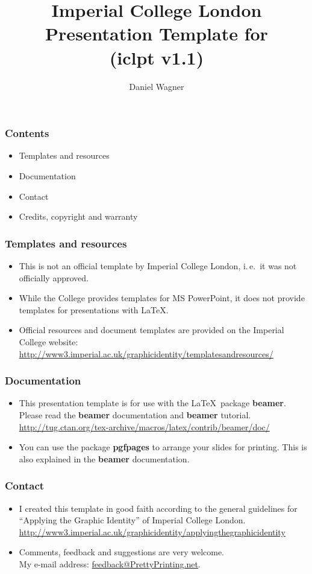 \documentclass[t]{beamer}
\author{Daniel Wagner}
\title[Imperial College London Presentation Template]{Imperial
College London\\Presentation Template for \LaTeXe\\
(iclpt v1.1)}
\begin{document}
\frame{\maketitle}

\begin{frame}
\frametitle{Contents}
	\begin{itemize}
	\item Templates and resources
	\item Documentation
	\item Contact
	\item Credits, copyright and warranty
	\end{itemize}
\end{frame}

\begin{frame}
\frametitle{Templates and resources}
	\begin{itemize}
	\item This is not an official template by Imperial 
	College London,
	i.\,e.\ it was not officially approved.
	\item While the College provides templates for 
	MS PowerPoint, it does not provide templates 
	for presentations with \LaTeX. 
	\item Official resources and document 
	templates are provided on the Imperial 
	College website:\\	
	\url{
http://www3.imperial.ac.uk/graphicidentity/templatesandresources/ }
	\end{itemize}
\end{frame}



\begin{frame}
\frametitle{Documentation}
	\begin{itemize}
	\item This presentation template is for use 
	with the \LaTeX\ package \textbf{beamer}.
	Please read the \textbf{beamer} documentation 
	and  \textbf{beamer} tutorial.\\	
\url{
http://tug.ctan.org/tex-archive/macros/latex/contrib/beamer/doc/}
	\item You can use the package \textbf{pgfpages} 
	to arrange your slides for printing. This is also explained
	in the \textbf{beamer} documentation.
	\end{itemize}
\end{frame}


\begin{frame}
\frametitle{Contact}
	\begin{itemize}
	\item I created this template in good faith according
	to the general guidelines for ``Applying the Graphic
	Identity'' of Imperial College London.\\	
\url{
http://www3.imperial.ac.uk/graphicidentity/applyingthegraphicidentity}
	\item Comments, feedback and suggestions are very welcome.\\
	My e-mail address:
	\href{mailto:feedback@prettyprinting.net}{feedback@PrettyPrinting.net}.
	\end{itemize}
\end{frame} 
\end{document}

